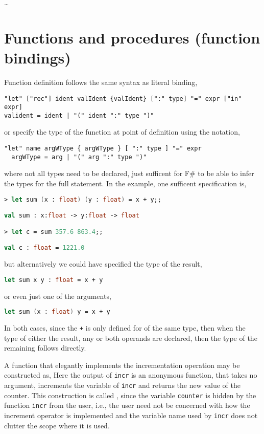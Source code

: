 
\dots


\section{Functions and procedures (function bindings)}
\label{chap:functions}
Function definition follows the same syntax as literal binding,
%
\begin{lstlisting}[language=EBNF]
"let" ["rec"] ident valIdent {valIdent} [":" type] "=" expr ["in" expr]
valident = ident | "(" ident ":" type ")"
\end{lstlisting}

or specify the type of the function at point of definition using the notation,
\begin{lstlisting}[language=ebnf]
  "let" name argWType { argWType } [ ":" type ] "=" expr
  argWType = arg | "(" arg ":" type ")"
\end{lstlisting}
where not all types need to be declared, just sufficent for F\# to be able to infer the types for the full statement. In the example, one sufficent specification is,
\begin{lstlisting}[language=fsharp,caption=fsharpi]
> let sum (x : float) (y : float) = x + y;;

val sum : x:float -> y:float -> float

> let c = sum 357.6 863.4;;

val c : float = 1221.0
\end{lstlisting}
but alternatively we could have specified the type of the result,
\begin{lstlisting}[language=fsharp]
  let sum x y : float = x + y
\end{lstlisting}
or even just one of the arguments,
\begin{lstlisting}[language=fsharp]
  let sum (x : float) y = x + y
\end{lstlisting}
In both cases, since the \lstinline|+|  is only defined for  of the same type, then when the type of either the result, any or both operands are declared, then the type of the remaining follows directly.





A function that elegantly implements the incrementation operation may be constructed as,
%
%
 Here the output of \texttt{incr} is an anonymous function, that takes no argument, increments the variable of \texttt{incr} and returns the new value of the counter. This construction is called , since the variable \texttt{counter} is hidden by the function \texttt{incr} from the user, i.e., the user need not be concerned with how the increment operator is implemented and the variable name used by \texttt{incr} does not clutter the scope where it is used.

